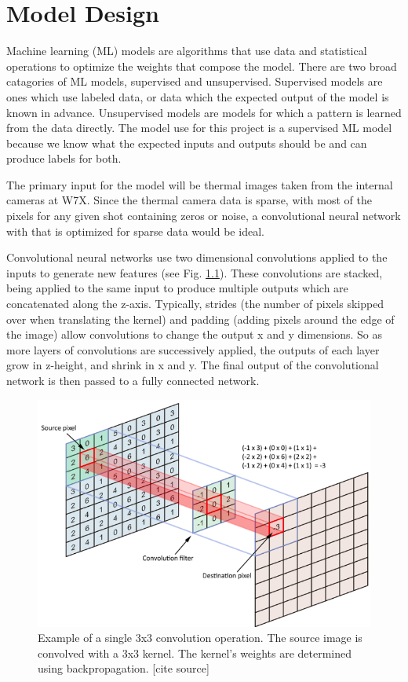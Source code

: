 %
\chapter{Model Design}
\label{sec:code:model}

Machine learning (ML) models are algorithms that use data and statistical operations to optimize the weights that compose the model.
There are two broad catagories of ML models, supervised and unsupervised.
Supervised models are ones which use labeled data, or data which the expected output of the model is known in advance.
Unsupervised models are models for which a pattern is learned from the data directly.
The model use for this project is a supervised ML model because we know what the expected inputs and outputs should be and can produce labels for both.

The primary input for the model will be thermal images taken from the internal cameras at W7X.
Since the thermal camera data is sparse, with most of the pixels for any given shot containing zeros or noise, a convolutional neural network with that is optimized for sparse data would be ideal.

Convolutional neural networks use two dimensional convolutions applied to the inputs to generate new features (see Fig. \ref{fig:code:2DConv}).
These convolutions are stacked, being applied to the same input to produce multiple outputs which are concatenated along the z-axis.
Typically, strides (the number of pixels skipped over when translating the kernel) and padding (adding pixels around the edge of the image) allow convolutions to change the output x and y dimensions.
So as more layers of convolutions are successively applied, the outputs of each layer grow in z-height, and shrink in x and y.
The final output of the convolutional network is then passed to a fully connected network.


\begin{figure}[htb]
    \includegraphics[width=\textwidth]{images/2d-Conv.png}
    \caption{Example of a single 3x3 convolution operation. The source image is convolved with a 3x3 kernel. The kernel's weights are determined using backpropagation. [cite source]}
    \label{fig:code:2DConv}
\end{figure}

